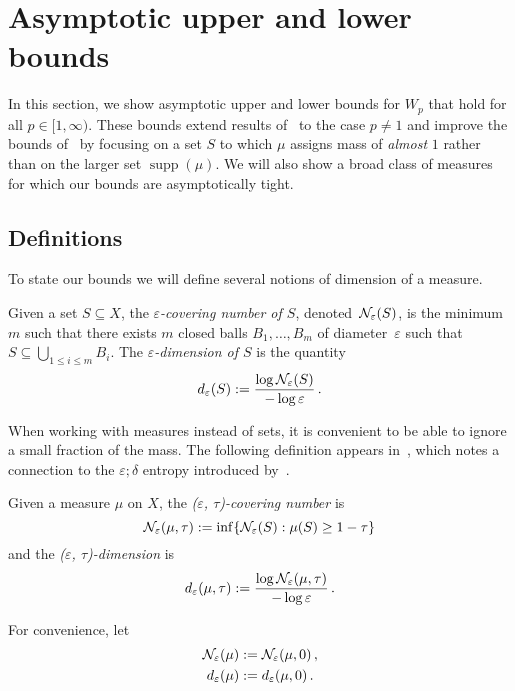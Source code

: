 \documentclass[sts]{imsart}
\newcommand*{\ep}{\varepsilon}
\DeclareMathOperator{\supp}{supp}
\begin{document}
\section{Asymptotic upper and lower bounds}\label{sec:asymptotic}
In this section, we show asymptotic upper and lower bounds for $W_p$ that hold for all $p \in [1, \infty)$.
These bounds extend results of~\cite{Dud68} to the case $p \neq 1$ and improve the bounds of~\cite{BoiLeg14} by focusing on a set $S$ to which $\mu$ assigns mass of \emph{almost} $1$ rather than on the larger set $\supp(\mu)$.
We will also show a broad class of measures for which our bounds are asymptotically tight.

\subsection{Definitions}To state our bounds we will define several notions of dimension of a measure.
\begin{definition}
Given a set $S \subseteq X$, the \emph{$\ep$-covering number of $S$}, denoted~$\cN_\ep(S)$, is the minimum $m$ such that there exists $m$ closed balls $B_1, \dots, B_m$ of diameter~$\ep$ such that $S \subseteq \bigcup_{1 \leq i \leq m} B_i$.
The \emph{$\ep$-dimension of $S$} is the quantity
\begin{equation*}
d_\ep(S) := \frac{\log \cN_\ep(S)}{- \log \ep}\,.
\end{equation*}
\end{definition}

When working with measures instead of sets, it is convenient to be able to ignore a small fraction of the mass.
The following definition appears in~\cite{Dud68}, which notes a connection to the $\ep;\delta$ entropy introduced by~\cite{PosRodRum67}.
\begin{definition}
Given a measure $\mu$ on $X$, the \emph{($\ep$, $\tau$)-covering number} is
\begin{equation*}
\cN_\ep(\mu, \tau) := \inf \{\cN_\ep(S): \mu(S) \geq 1- \tau\}
\end{equation*}
and the \emph{($\ep$, $\tau$)-dimension} is
\begin{equation*}
d_\ep(\mu, \tau) := \frac{\log \cN_\ep(\mu, \tau)}{-\log \ep}\,.
\end{equation*}
\end{definition}

For convenience, let
\begin{align*}
\cN_\ep(\mu) & := \cN_\ep(\mu, 0)\,, \\
d_\ep(\mu) & := d_\ep(\mu,0)\,.
\end{align*}
\end{document}
